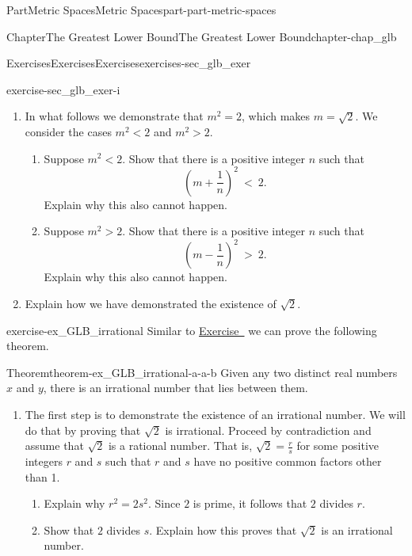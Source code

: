 \documentclass[oneside,10pt,]{book}
\newcommand{\xreffont}{\relax}
\numberwithin{equation}{chapter}
\newcommand{\lt}{<}
\newcommand{\gt}{>}
\begin{document}
\begin{partptx}{Part}{Metric Spaces}{}{Metric Spaces}{}{}{part-part-metric-spaces}
\begin{chapterptx}{Chapter}{The Greatest Lower Bound}{}{The Greatest Lower Bound}{}{}{chapter-chap_glb}
\begin{exercises-section}{Exercises}{Exercises}{}{Exercises}{}{}{exercises-sec_glb_exer}
\begin{divisionexercise}{9}{}{}{exercise-sec_glb_exer-i}
\begin{enumerate}[font=\bfseries,label=(\alph*),ref=\alph*]
\item{}In what follows we demonstrate that \(m^2 = 2\), which makes \(m = \sqrt{2}\). We consider the cases \(m^2 \lt  2\) and \(m^2 \gt 2\).%
\begin{enumerate}[font=\bfseries,label=(\roman*),ref=\theenumi.\roman*]%
\item{}Suppose \(m^2 \lt  2\). Show that there is a positive integer \(n\) such that%
\begin{equation*}
\left(m+\frac{1}{n}\right)^2~\lt ~2\text{.}
\end{equation*}
Explain why this also cannot happen.%
\item{}Suppose \(m^2 \gt 2\). Show that there is a positive integer \(n\) such that%
\begin{equation*}
\left(m-\frac{1}{n}\right)^2~\gt~2\text{.}
\end{equation*}
Explain why this also cannot happen.%
\end{enumerate}%
\item{}Explain how we have demonstrated the existence of \(\sqrt{2}\).%
\end{enumerate}%
\end{divisionexercise}%
\begin{divisionexercise}{10}{}{}{exercise-ex_GLB_irrational}%
Similar to \hyperlink{exercise-ex_GLB_rational}{Exercise~{\xreffont 7}} we can prove the following theorem. \begin{theorem}{Theorem}{}{}{theorem-ex_GLB_irrational-a-a-b}%
Given any two distinct real numbers \(x\) and \(y\), there is an irrational number that lies between them.%
\end{theorem}
%
\begin{enumerate}[font=\bfseries,label=(\alph*),ref=\alph*]%
\item{}The first step is to demonstrate the existence of an irrational number. We will do that by proving that \(\sqrt{2}\) is irrational. Proceed by contradiction and assume that \(\sqrt{2}\) is a rational number. That is, \(\sqrt{2} = \frac{r}{s}\) for some positive integers \(r\) and \(s\) such that \(r\) and \(s\) have no positive common factors other than 1.%
\begin{enumerate}[font=\bfseries,label=(\roman*),ref=\theenumi.\roman*]%
\item{}Explain why \(r^2=2s^2\). Since \(2\) is prime, it follows that \(2\) divides \(r\).%
\item{}Show that \(2\) divides \(s\). Explain how this proves that \(\sqrt{2}\) is an irrational number.%

\end{enumerate}
\end{enumerate}
\end{divisionexercise}
\end{exercises-section}
\end{chapterptx}
\end{partptx}
\end{document}
